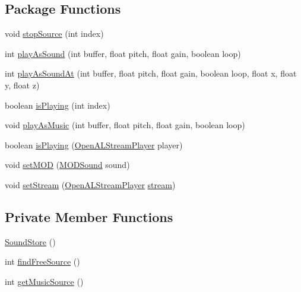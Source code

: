 \subsection*{Package Functions}
\begin{DoxyCompactItemize}
\item 
void \mbox{\hyperlink{classorg_1_1newdawn_1_1slick_1_1openal_1_1_sound_store_abbc79b5bafc0b1e6108e028e8232f572}{stop\+Source}} (int index)
\item 
int \mbox{\hyperlink{classorg_1_1newdawn_1_1slick_1_1openal_1_1_sound_store_a8ab9e98f32e3ec39095f6bac427c3d0a}{play\+As\+Sound}} (int buffer, float pitch, float gain, boolean loop)
\item 
int \mbox{\hyperlink{classorg_1_1newdawn_1_1slick_1_1openal_1_1_sound_store_ac02e6575d7d04dbc045fe86bfaa506e3}{play\+As\+Sound\+At}} (int buffer, float pitch, float gain, boolean loop, float x, float y, float z)
\item 
boolean \mbox{\hyperlink{classorg_1_1newdawn_1_1slick_1_1openal_1_1_sound_store_a986a26824f143a9fa9df2161b13edd44}{is\+Playing}} (int index)
\item 
void \mbox{\hyperlink{classorg_1_1newdawn_1_1slick_1_1openal_1_1_sound_store_a1408e7b11a103ec98a66350073c89ffe}{play\+As\+Music}} (int buffer, float pitch, float gain, boolean loop)
\item 
boolean \mbox{\hyperlink{classorg_1_1newdawn_1_1slick_1_1openal_1_1_sound_store_a275f068088a5693d51241a42ee3b69a8}{is\+Playing}} (\mbox{\hyperlink{classorg_1_1newdawn_1_1slick_1_1openal_1_1_open_a_l_stream_player}{Open\+A\+L\+Stream\+Player}} player)
\item 
void \mbox{\hyperlink{classorg_1_1newdawn_1_1slick_1_1openal_1_1_sound_store_a2c4b2292d9999e9ab7afa5ac5ac27224}{set\+M\+OD}} (\mbox{\hyperlink{classorg_1_1newdawn_1_1slick_1_1openal_1_1_m_o_d_sound}{M\+O\+D\+Sound}} sound)
\item 
void \mbox{\hyperlink{classorg_1_1newdawn_1_1slick_1_1openal_1_1_sound_store_ab22cf64fd9231d5b4455bf31d7893f85}{set\+Stream}} (\mbox{\hyperlink{classorg_1_1newdawn_1_1slick_1_1openal_1_1_open_a_l_stream_player}{Open\+A\+L\+Stream\+Player}} \mbox{\hyperlink{classorg_1_1newdawn_1_1slick_1_1openal_1_1_sound_store_a3529a80a2ca84a63d3bdc55194f52ac7}{stream}})
\end{DoxyCompactItemize}
\subsection*{Private Member Functions}
\begin{DoxyCompactItemize}
\item 
\mbox{\hyperlink{classorg_1_1newdawn_1_1slick_1_1openal_1_1_sound_store_a2de0274f76fc1ffdc4e24827b164844d}{Sound\+Store}} ()
\item 
int \mbox{\hyperlink{classorg_1_1newdawn_1_1slick_1_1openal_1_1_sound_store_af12835b8519e39b5fcc1e51ab9dbed3c}{find\+Free\+Source}} ()
\item 
int \mbox{\hyperlink{classorg_1_1newdawn_1_1slick_1_1openal_1_1_sound_store_ac2d5dca8d89e5fe899691ddb4be2fc12}{get\+Music\+Source}} ()
\end{DoxyCompactItemize}
